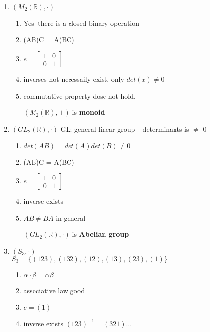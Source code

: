 \documentclass[12pt]{article}
\begin{document}
\begin{enumerate}
\begin{enumerate}
\begin{enumerate}
            \item $(M_2(\mathbb{R}),\cdot)$
            \begin{enumerate}
                \item Yes, there is a closed binary operation.
                \item (AB)C = A(BC)
                \item $e = \begin{bmatrix}
                    1 & 0 \\ 0 & 1
                \end{bmatrix}$
                \item inverses not necessaily exist. only $det(x) \ne 0$
                \item commutative property dose not hold.
                
                $(M_2(\mathbb{R}),+)$ is \textbf{monoid}
            \end{enumerate}

            \item $(GL_2(\mathbb{R}), \cdot)$ GL: general linear group -- determinants is $\ne$ 0
            \begin{enumerate}
                \item $det(AB) = det(A)det(B) \ne 0$
                \item (AB)C = A(BC)
                \item $e = \begin{bmatrix}
                    1 & 0 \\ 0 & 1
                \end{bmatrix}$
                \item inverse exists
                \item $AB \ne BA$ in general
                
                $(GL_2(\mathbb{R}), \cdot )$ is \textbf{Abelian group}
            \end{enumerate}

            \item $(S_3, \cdot)$\\
            $S_3 = \{(123),(132),(12),(13),(23),(1)\}$
            \begin{enumerate}
                \item $\alpha \cdot \beta = \alpha\beta$
                \item associative law good
                \item $e = (1)$
                \item inverse exists $(123)^{-1} = (321) \dots$
                

\end{enumerate}
\end{enumerate}
\end{enumerate}
\end{enumerate}
\end{document}
